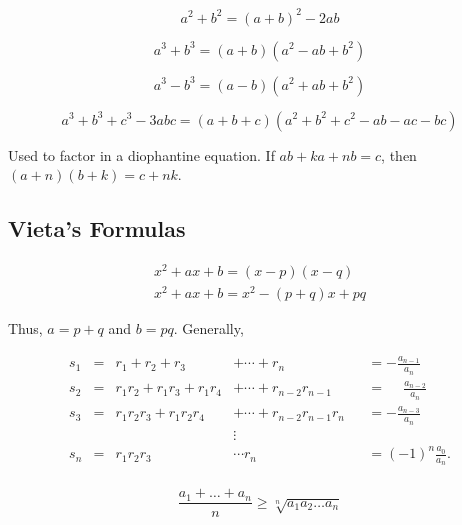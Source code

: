 \begin{definition}
    \begin{equation}
        a^2+b^2=(a+b)^2-2ab
    \end{equation}
\end{definition}

\begin{definition}
    \begin{equation}
        a^3+b^3=(a+b)(a^2-ab+b^2)
    \end{equation}
\end{definition}

\begin{definition}
    \begin{equation}
        a^3-b^3=(a-b)(a^2+ab+b^2)
    \end{equation}
\end{definition}

\begin{definition}
    \begin{equation}
        a^3+b^3+c^3-3abc=(a+b+c)(a^2+b^2+c^2-ab-ac-bc)
    \end{equation}
\end{definition}

\begin{definition}
    Used to factor in a diophantine equation.
    If $ab + ka + nb = c$, then $(a+n)(b+k)=c+nk$.
\end{definition}

\subsection{Vieta's Formulas}

\begin{eqnarray}
    x^2+ax+b=(x-p)(x-q)\\
    x^2+ax+b=x^2-(p+q)x+pq
\end{eqnarray}

Thus, $a=p+q$ and $b=pq$. Generally,

\begin{align*}	 
    s_1&= & r_1+r_2+r_3&+\cdots+r_n & &=-\frac{a_{n-1}}{a_n} \\	 s_2&= & r_1r_2+r_1r_3+r_1r_4&+\cdots+r_{n-2}r_{n-1} & &=\phantom{-}\frac{a_{n-2}}{a_n} \\	 s_3&= & r_1r_2r_3+r_1r_2r_4&+\cdots+r_{n-2}r_{n-1}r_n & &=-\frac{a_{n-3}}{a_n} \\	 & & &\vdots & & \\	 s_n&= & r_1r_2r_3&\cdots r_n & &=(-1)^n\frac{a_0}{a_n}.\\	 
\end{align*}

\begin{definition}[AM-GM Inequality]
    \begin{equation}
        \frac{a_1+\ldots+a_n}{n}\geq \sqrt[n]{a_1a_2\ldots a_n}
    \end{equation}
\end{definition}